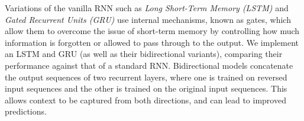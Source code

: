 \documentclass[12pt,a4paper]{article}
\begin{document}
Variations of the vanilla RNN such as \textit{Long Short-Term Memory (LSTM)} \cite{hochreiter1997long} and \textit{Gated Recurrent Units (GRU)}\cite{cho2014learning} use internal mechanisms, known as gates, which allow them to overcome the issue of short-term memory by controlling how much information is forgotten or allowed to pass through to the output. We implement an LSTM and GRU (as well as their bidirectional variants), comparing their performance against that of a standard RNN. Bidirectional models concatenate the output sequences of two recurrent layers, where one is trained on reversed input sequences and the other is trained on the original input sequences. This allows context to be captured from both directions, and can lead to improved predictions.



\end{document}
